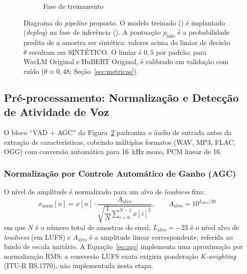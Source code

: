 \documentclass[12pt,a4paper]{article}
\begin{document}
\begin{figure}[H]
\begin{subfigure}[b]{0.46\textwidth}
\caption{Fase de treinamento}
\label{fig:pipeline_train}
\end{subfigure}
\caption{Diagrama do \textit{pipeline} proposto. O modelo treinado
() é implantado (\textit{deploy}) na fase de
inferência (). A pontuação $p_{\mathrm{fake}}$ é a
probabilidade predita de a amostra ser sintética: valores acima do limiar de
decisão $\theta$ resultam em SINTÉTICO. O limiar é $0{,}5$ por padrão; para
WavLM Original e HuBERT Original, é calibrado em validação com ruído
($\theta \approx 0{,}48$; Seção~\ref{sec:metricas}).}
\label{fig:pipeline}
\end{figure}

\newpage

\subsection{Pré-processamento: Normalização e Detecção de Atividade de Voz}
\label{sec:preprocessamento}

O bloco ``VAD + AGC'' da Figura~\ref{fig:pipeline} padroniza o áudio de
entrada antes da extração de características, cobrindo múltiplos formatos
(WAV, MP3, FLAC, OGG) com conversão automática para \SI{16}{\kilo\hertz}
mono, PCM linear de \SI{16}{\bit}.

\subsubsection*{Normalização por Controle Automático de Ganho (AGC)}

O nível de amplitude é normalizado para um alvo de \textit{loudness} fixo:
\begin{equation}
\label{eq:agc}
x_{\mathrm{norm}}[n] = x[n] \cdot
\frac{A_{\mathrm{alvo}}}{\sqrt{\dfrac{1}{N}\displaystyle\sum_{i=0}^{N-1}x[i]^2}},
\qquad A_{\mathrm{alvo}} = 10^{L_{\mathrm{alvo}}/20}
\end{equation}
\noindent
em que $N$ é o número total de amostras do sinal,
$L_{\mathrm{alvo}} = -23$ é o nível alvo de \textit{loudness} (em LUFS) e
$A_{\mathrm{alvo}}$ é a amplitude linear correspondente, referida ao fundo de
escala unitário. A Equação~\ref{eq:agc} implementa uma aproximação por
normalização RMS: a conversão LUFS exata exigiria ponderação
\textit{K-weighting} (ITU-R BS.1770), não implementada nesta etapa.
\end{document}

